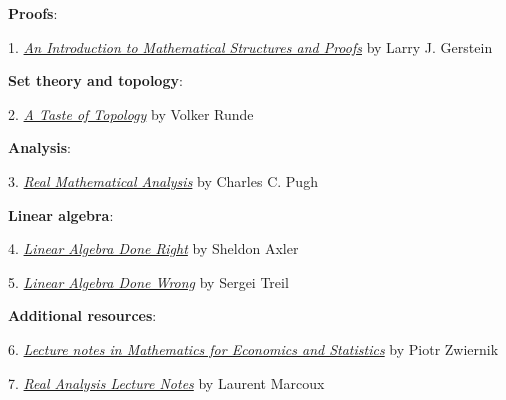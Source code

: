 \documentclass[12pt]{article}
\begin{document}
\vspace{1em}
\newpage
\noindent
{\bf{Proofs}}:
\vspace{0.1cm}

1. \href{https://link-springer-com.myaccess.library.utoronto.ca/book/10.1007/978-1-4614-4265-3}{{\emph{An Introduction to Mathematical Structures and Proofs}}} by Larry J. Gerstein

\vspace{1em}

\noindent
{\bf{Set theory and topology}}:
\vspace{0.1cm}

2. \href{https://link-springer-com.myaccess.library.utoronto.ca/book/10.1007/0-387-28387-0}{\emph{A Taste of Topology}} by Volker Runde

\vspace{1em}


\noindent
{\bf{Analysis}}:
\vspace{0.1cm}


3. \href{https://link-springer-com.myaccess.library.utoronto.ca/book/10.1007/978-3-319-17771-7}{\emph{Real Mathematical Analysis}} by Charles C. Pugh

\vspace{1em}

\noindent
{\bf{Linear algebra}}:

\vspace{0.1cm}

4. \href{https://link-springer-com.myaccess.library.utoronto.ca/book/10.1007/978-3-319-11080-6}{{\emph{Linear Algebra Done Right}}} by Sheldon Axler

5. \href{https://www.math.brown.edu/streil/papers/LADW/LADW.html}{{\emph{Linear Algebra Done Wrong}}} by Sergei Treil

\vspace{1em}

\noindent
{\bf{Additional resources}}:
\vspace{0.1cm}

6. \href{http://84.89.132.1/~piotr/docs/RealAnalysisNotes.pdf}{\emph{Lecture notes in Mathematics for Economics and Statistics}} by Piotr Zwiernik

7. \href{http://www.math.uwaterloo.ca/~lwmarcou/notes/pmath351.pdf}{{\emph{Real Analysis Lecture Notes}}} by Laurent Marcoux
\end{document}
